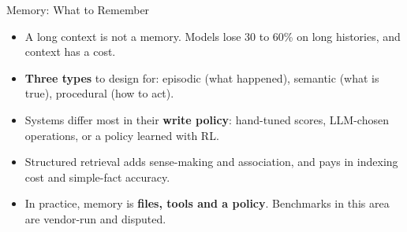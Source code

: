 \begin{frame}{Memory: What to Remember}
    \begin{itemize}\itemsep0.4em
        \item A long context is not a memory. Models lose 30 to 60\% on long histories, and context has a cost.
        \item \textbf{Three types} to design for: episodic (what happened), semantic (what is true), procedural (how to act).
        \item Systems differ most in their \textbf{write policy}: hand-tuned scores, LLM-chosen operations, or a policy learned with RL.
        \item Structured retrieval adds sense-making and association, and pays in indexing cost and simple-fact accuracy.
        \item In practice, memory is \textbf{files, tools and a policy}. Benchmarks in this area are vendor-run and disputed.
    \end{itemize}
    \vspace{0.4em}
\end{frame}
